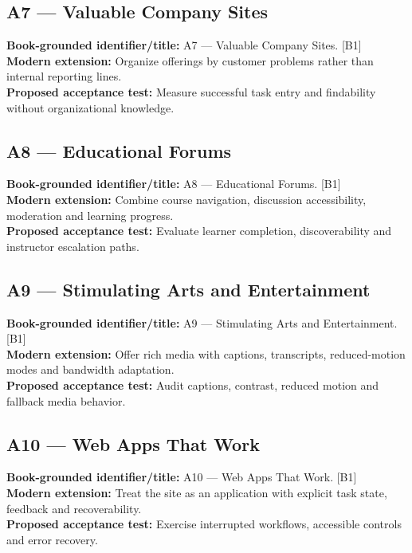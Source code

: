 \documentclass[11pt]{article}
\begin{document}
\subsection{A7 — Valuable Company Sites}
\noindent\textcolor{Ocean}{\textbf{Book-grounded identifier/title:}} A7 — Valuable Company Sites. [B1]\\
\textcolor{Mint}{\textbf{Modern extension:}} Organize offerings by customer problems rather than internal reporting lines.\\
\textcolor{Amber}{\textbf{Proposed acceptance test:}} Measure successful task entry and findability without organizational knowledge.\medskip
\subsection{A8 — Educational Forums}
\noindent\textcolor{Ocean}{\textbf{Book-grounded identifier/title:}} A8 — Educational Forums. [B1]\\
\textcolor{Mint}{\textbf{Modern extension:}} Combine course navigation, discussion accessibility, moderation and learning progress.\\
\textcolor{Amber}{\textbf{Proposed acceptance test:}} Evaluate learner completion, discoverability and instructor escalation paths.\medskip
\subsection{A9 — Stimulating Arts and Entertainment}
\noindent\textcolor{Ocean}{\textbf{Book-grounded identifier/title:}} A9 — Stimulating Arts and Entertainment. [B1]\\
\textcolor{Mint}{\textbf{Modern extension:}} Offer rich media with captions, transcripts, reduced-motion modes and bandwidth adaptation.\\
\textcolor{Amber}{\textbf{Proposed acceptance test:}} Audit captions, contrast, reduced motion and fallback media behavior.\medskip
\subsection{A10 — Web Apps That Work}
\noindent\textcolor{Ocean}{\textbf{Book-grounded identifier/title:}} A10 — Web Apps That Work. [B1]\\
\textcolor{Mint}{\textbf{Modern extension:}} Treat the site as an application with explicit task state, feedback and recoverability.\\
\textcolor{Amber}{\textbf{Proposed acceptance test:}} Exercise interrupted workflows, accessible controls and error recovery.\medskip
\end{document}
